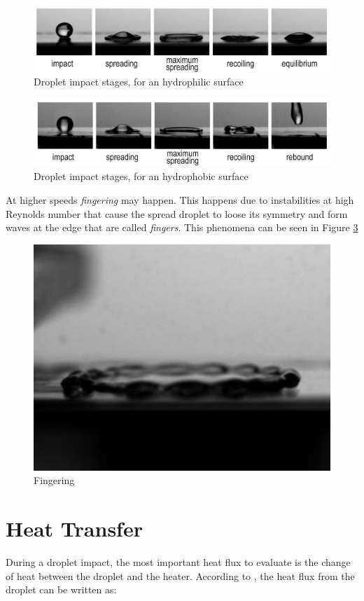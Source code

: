 \begin{figure}[h]
\centering
\includegraphics[width=0.9\linewidth]{Figures/2.Chapter/droplet.png}
\caption{Droplet impact stages, for an hydrophilic surface}
\label{fig:droplet}
\end{figure}

\begin{figure}[h]
\centering
\includegraphics[width=0.9\linewidth]{Figures/2.Chapter/droplethf.png}
\caption{Droplet impact stages, for an hydrophobic surface}
\label{fig:droplethf}
\end{figure}

\par At higher speeds \textit{fingering} may happen. This happens due to instabilities at high Reynolds number that cause the spread droplet to loose its symmetry and form waves at the edge that are called \textit{fingers}. This phenomena can be seen in Figure \ref{fig:fingering}

\begin{figure}[h]
\centering
\includegraphics[width=0.35\linewidth]{Figures/2.Chapter/fingering.png}
\caption{Fingering}
\label{fig:fingering}
\end{figure}

\section{Heat Transfer}
\label{sec:heat}

\par During a droplet impact, the most important heat flux to evaluate is the change of heat between the droplet and the heater. According to \cite{sielaff2014experimental}, the heat flux from the droplet can be written as:


